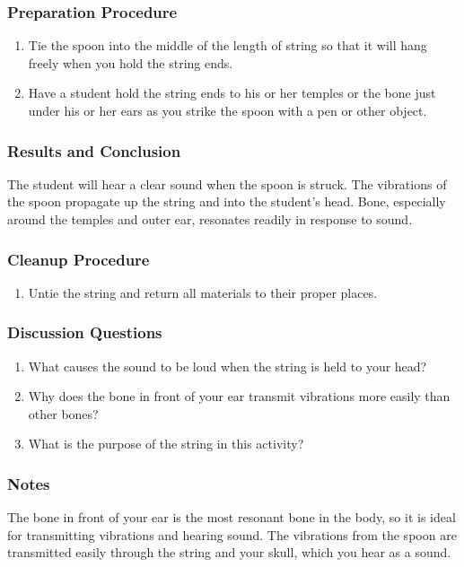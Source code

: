 \subsubsection*{Preparation Procedure}
\begin{enumerate}
\item{Tie the spoon into the middle of the length of string so that it will hang freely when you hold the string ends.}
\item{Have a student hold the string ends to his or her temples or the bone just under his or her ears as you strike the spoon with a pen or other object.}
\end{enumerate}

\subsubsection*{Results and Conclusion}
The student will hear a clear sound when the spoon is struck.  The vibrations of the spoon propagate up the string and into
the student's head. Bone, especially around the temples and outer ear, resonates readily in response to sound.

\subsubsection*{Cleanup Procedure}
\begin{enumerate}
\item{Untie the string and return all materials to their proper places.}
\end{enumerate}

\subsubsection*{Discussion Questions}
\begin{enumerate}
\item{What causes the sound to be loud when the string is held to your head?}
\item{Why does the bone in front of your ear transmit vibrations more easily than other bones?}
\item{What is the purpose of the string in this activity?}
\end{enumerate}

\subsubsection*{Notes}
The bone in front of your ear is the most resonant bone in the body, so it is ideal for transmitting vibrations and hearing sound.  The vibrations from the spoon are transmitted easily through the string and your skull, which you hear as a sound.

